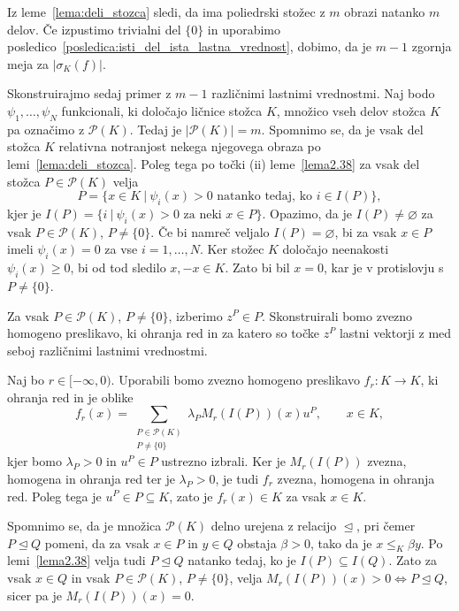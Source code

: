 \documentclass[mat2, tisk]{fmfdelo}
\begin{document}
\begin{dokaz}
Iz leme~\ref{lema:deli_stozca} sledi, da ima poliedrski stožec z $m$
obrazi natanko $m$ delov. Če izpustimo trivialni del $\{0\}$ in uporabimo
posledico~\ref{posledica:isti_del_ista_lastna_vrednost}, dobimo, da je
$m-1$ zgornja meja za $|\sigma_K(f)|$.

Skonstruirajmo sedaj primer z $m-1$ različnimi lastnimi vrednostmi. Naj bodo 
$\psi_1,\ldots,\psi_N$ funkcionali, ki določajo ličnice
stožca $K$, množico vseh delov stožca $K$ pa označimo z
$\mathcal{P}(K)$. Tedaj je $|\mathcal{P}(K)|=m$. Spomnimo se, da je vsak
del stožca $K$ relativna notranjost nekega njegovega obraza po lemi~\ref{lema:deli_stozca}. Poleg tega
po točki (ii) leme~\ref{lema2.38} za vsak del stožca $P\in\mathcal{P}(K)$ velja
\[
P
=
\{x\in K ~|~ \psi_i(x)>0\text{ natanko tedaj, ko }i\in I(P)\},
\]
kjer je
$I(P)=\{i ~|~ \psi_i(x)>0\text{ za neki }x\in P\}$.
Opazimo, da je $I(P)\neq\varnothing$ za vsak
$P\in\mathcal{P}(K)$, $P\neq\{0\}$. Če bi namreč
veljalo $I(P)=\varnothing$, bi za vsak $x\in P$
imeli $\psi_i(x)=0$ za vse $i=1,\ldots,N$.
Ker stožec $K$ določajo neenakosti $\psi_i(x)\geq0$,
bi od tod sledilo $x,-x\in K$. Zato bi bil $x=0$,
kar je v protislovju s $P\neq\{0\}$.

Za vsak $P\in\mathcal{P}(K)$, $P\neq\{0\}$, izberimo $z^P\in P$.
Skonstruirali bomo zvezno homogeno preslikavo, ki ohranja red in za
katero so točke $z^P$ lastni vektorji z med seboj različnimi lastnimi
vrednostmi.

Naj bo $r\in[-\infty,0)$. Uporabili bomo zvezno homogeno preslikavo
$f_r\colon K\longrightarrow K$, ki ohranja red in je oblike
\begin{equation}\label{eq:preslikava_fr}
f_r(x)
=
\sum_{\substack{P\in\mathcal{P}(K)\\P\neq\{0\}}}
\lambda_P M_r(I(P))(x)u^P,
\qquad x\in K,
\end{equation}
kjer bomo $\lambda_P>0$ in $u^P\in P$ ustrezno izbrali.
Ker je $M_r(I(P))$ zvezna, homogena in ohranja red ter je $\lambda_P>0$, je tudi $f_r$ zvezna, 
homogena in ohranja red. Poleg tega je $u^P\in P \subseteq K$, zato je $f_r(x)\in K$ za vsak $x\in K$.

Spomnimo se, da je množica $\mathcal{P}(K)$ delno urejena z relacijo
$\trianglelefteq$, pri čemer $P\trianglelefteq Q$ pomeni, da za vsak
$x\in P$ in $y\in Q$ obstaja $\beta>0$, tako da je $x\leq_K\beta y$.
Po lemi~\ref{lema2.38} velja tudi
$P\trianglelefteq Q$ natanko tedaj, ko je $I(P)\subseteq I(Q)$.
Zato za vsak $x\in Q$ in vsak $P\in\mathcal{P}(K)$,
$P\neq\{0\}$, velja
$M_r(I(P))(x)>0 \Longleftrightarrow P\trianglelefteq Q$,
sicer pa je $M_r(I(P))(x)=0$.


\end{dokaz}
\end{document}

